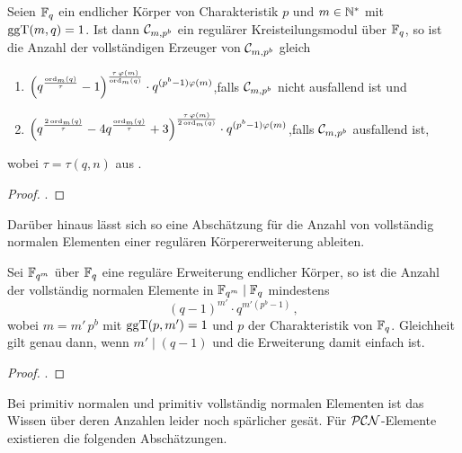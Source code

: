 \begin{satz}
  \label{satz:anzahl_vollst_erzeuger}
  Seien $\mathbb{F}_q$ ein endlicher Körper von Charakteristik $p$ und $m \in \mathbb{N}^\ast$
  mit $\operatorname{ggT}(m,q)=1$. Ist dann $\mathcal{C}_{m,p^b}$ ein regulärer Kreisteilungsmodul
  über $\mathbb{F}_q$, so ist die Anzahl der vollständigen Erzeuger von 
  $\mathcal{C}_{m,p^b}$ gleich
  \begin{enumerate}
    \item $\displaystyle \left( q^{\frac{\ord_m(q)}{\tau}}-1 \right)%
      ^{\frac{\tau\,\varphi(m)}{\ord_m(q)}} \cdot 
      q^{(p^b-1)\varphi(m)}$,\quad falls $\mathcal{C}_{m,p^b}$ nicht ausfallend ist und
    \item $\displaystyle \left( q^{\frac{2\ord_m(q)}{\tau}}
      -4q^{\frac{\ord_m(q)}{\tau}}+3\right)%
      ^{\frac{\tau\,\varphi(m)}{2\ord_m(q)}} \cdot 
      q^{(p^b-1)\varphi(m)}$,\quad falls $\mathcal{C}_{m,p^b}$ ausfallend ist,
  \end{enumerate}
  wobei $\tau = \tau(q,n)$ aus .
\end{satz}
\begin{proof}
  \autocite[Proposition 21.1, Proposition 21.2]{hachenberger1997finite}.
\end{proof}

Darüber hinaus lässt sich so eine Abschätzung für die Anzahl von vollständig
normalen Elementen einer regulären Körpererweiterung ableiten.

\begin{satz}
  Sei $\mathbb{F}_{q^m}$ über $\mathbb{F}_q$ eine reguläre Erweiterung endlicher Körper, so ist
  die Anzahl der vollständig normalen Elemente in $\mathbb{F}_{q^m}\mid \mathbb{F}_q$
  mindestens
  \[ (q-1)^{m'}\cdot q^{m'(p^b-1)} \,,\]
  wobei $m = m'\,p^b$ mit $\operatorname{ggT}(p,m')=1$ und $p$ der Charakteristik von $\mathbb{F}_q$.
  Gleichheit gilt genau dann, wenn $m' \mid (q-1)$ und die Erweiterung damit 
  einfach ist.
\end{satz}
\begin{proof}
  \autocite[Theorem 21.3, Theorem 6.1]{hachenberger1997finite}.
\end{proof}

Bei primitiv normalen und primitiv vollständig normalen Elementen
ist das Wissen über deren Anzahlen leider noch spärlicher gesät. 
Für $\mathcal{PCN}$-Elemente existieren die folgenden Abschätzungen.

